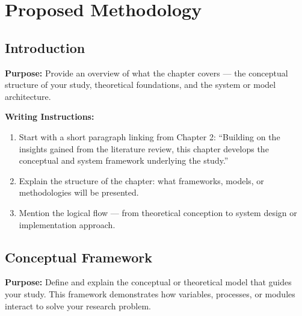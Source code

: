 \chapter{Proposed Methodology}
\label{System Architecture}



\section{Introduction}

{\color{blue}\textbf{Purpose:}
Provide an overview of what the chapter covers — the conceptual structure of your study, theoretical foundations, and the system or model architecture.} \\

{\color{red}\textbf{Writing Instructions:}
\begin{enumerate}
    \item Start with a short paragraph linking from Chapter 2: ``Building on the insights gained from the literature review, this chapter develops the conceptual and system framework underlying the study.''
    
    \item Explain the structure of the chapter: what frameworks, models, or methodologies will be presented.
    
    \item Mention the logical flow — from theoretical conception to system design or implementation approach.
\end{enumerate}}




\section{Conceptual Framework}

{\color{blue}\textbf{Purpose:}
Define and explain the conceptual or theoretical model that guides your study. This framework demonstrates how variables, processes, or modules interact to solve your research problem.} \\

